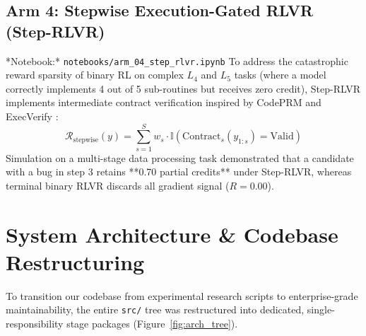 \documentclass[12pt, a4paper]{article}
\begin{document}
\subsection{Arm 4: Stepwise Execution-Gated RLVR (Step-RLVR)}
*Notebook:* \texttt{notebooks/arm\_04\_step\_rlvr.ipynb}  
To address the catastrophic reward sparsity of binary RL on complex $L_4$ and $L_5$ tasks (where a model correctly implements 4 out of 5 sub-routines but receives zero credit), Step-RLVR implements intermediate contract verification inspired by CodePRM \cite{codeprm} and ExecVerify \cite{execverify}:
\begin{equation}
\mathcal{R}_{\text{stepwise}}(y) = \sum_{s=1}^{S} w_s \cdot \mathbb{I}(\text{Contract}_s(y_{1:s}) = \text{Valid})
\end{equation}
Simulation on a multi-stage data processing task demonstrated that a candidate with a bug in step 3 retains **0.70 partial credits** under Step-RLVR, whereas terminal binary RLVR discards all gradient signal ($R=0.00$).

\section{System Architecture \& Codebase Restructuring}

To transition our codebase from experimental research scripts to enterprise-grade maintainability, the entire \texttt{src/} tree was restructured into dedicated, single-responsibility stage packages (Figure~\ref{fig:arch_tree}).
\end{document}
